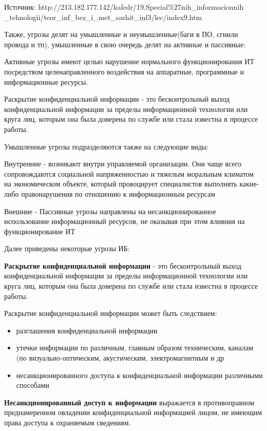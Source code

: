 Источник: http://213.182.177.142/kafedr/19.Special\%27nih\_informacionnih
\_tehnologii/teor\_inf\_bez\_i\_met\_sashit\_inf3/lec/index9.htm

Также, угрозы делят на умышленные и неумышленные(баги в ПО, сгнили провода и тп), умышленные в свою очередь делят на активные и пассивные:

Активные угрозы имеют целью нарушение нормального функционирования ИТ посредством целенаправленного воздействия на аппаратные, программные и информационные ресурсы.

Раскрытие конфиденциальной информации - это бесконтрольный выход конфиденциальной информации за пределы информационной технологии или круга лиц, которым она была доверена по службе или стала известна в процессе работы.

Умышленные угрозы подразделяются также на следующие виды:

Внутренние - возникают внутри управляемой организации. Они чаще всего сопровождаются социальной напряженностью и тяжелым моральным климатом на экономическом объекте, который провоцирует специалистов выполнять какие-либо правонарушения по отношению к информационным ресурсам

Внешние - Пассивные угрозы направлены на несанкционированное использование информационный ресурсов, не оказывая при этом влияния на функционирование ИТ

Далее приведены некоторые угрозы ИБ:

\textbf{Раскрытие конфиденциальной информации} - это бесконтрольный выход конфиденциальной информации за пределы информационной технологии или круга лиц, которым она была доверена по службе или стала известна в процессе работы.

Раскрытие конфиденциальной информации может быть следствием:
\begin{itemize}
    \item разглашения конфиденциальной информации
    \item утечки информации по различным, главным образом техническим, каналам (по визуально-оптическим, акустическим, электромагнитным и др
    \item несанкционированного доступа к конфиденциальной информации различными способами
\end{itemize}

\textbf{Несанкционированный доступ к информации} выражается в противоправном преднамеренном овладении конфиденциальной информацией лицом, не имеющим права доступа к охраняемым сведениям.

